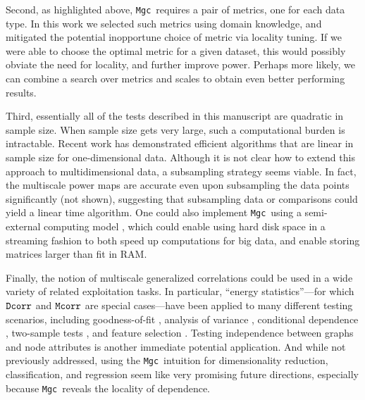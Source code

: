 \documentclass[11pt]{article}
\providecommand{\sct}[1]{{\sc \texttt{#1}}}
\newcommand{\Mgc}{\sct{Mgc}}
\newcommand{\Dcorr}{\sct{Dcorr}}
\newcommand{\Mcorr}{\sct{Mcorr}}
\begin{document}

Second, as highlighted above, \Mgc~requires a pair of metrics, one for each data type. In this work we selected such metrics using domain knowledge, and mitigated the potential inopportune choice of metric via locality tuning.  If we were able to choose the optimal metric for a given dataset, this would possibly obviate the need for locality, and further improve power.  Perhaps more likely, we can combine a search over metrics and scales to obtain even better performing results.  

Third, essentially all of the tests described in this manuscript are quadratic in sample size.  When sample size gets very large, such a computational burden is intractable.  Recent work has demonstrated efficient algorithms that are linear in sample size \cite{Hou2016} for one-dimensional data.  Although it is not clear how to extend this approach to multidimensional data, a subsampling strategy seems viable.  In fact, the multiscale power maps are accurate even upon subsampling the data points significantly (not shown), suggesting that subsampling data or comparisons  could yield a linear time algorithm.  One could also implement \Mgc~using a semi-external computing model \cite{Zheng2016},  which could enable using hard disk space in a streaming fashion to both speed up computations for big data, and enable storing matrices larger than fit in RAM.

Finally, the notion of multiscale generalized correlations could be used in a wide variety of related exploitation tasks.  In particular, ``energy statistics''---for which $\Dcorr$ and $\Mcorr$ are special cases---have been applied to many different testing scenarios, including goodness-of-fit  \cite{Szekely2005}, analysis of variance  \cite{Rizzo2010}, conditional dependence  \cite{Szekely2014,Wang2015},  two-sample tests \cite{Szekely2004}, and feature selection \cite{LiZhongZhu2012,Zhong2015}.   
Testing independence between graphs and node attributes \cite{Fosdick16} is another immediate potential application.  And while not previously addressed, using the \Mgc~intuition for dimensionality reduction, classification, and regression seem like very promising future directions, especially because \Mgc~reveals the locality of dependence.
\end{document}

